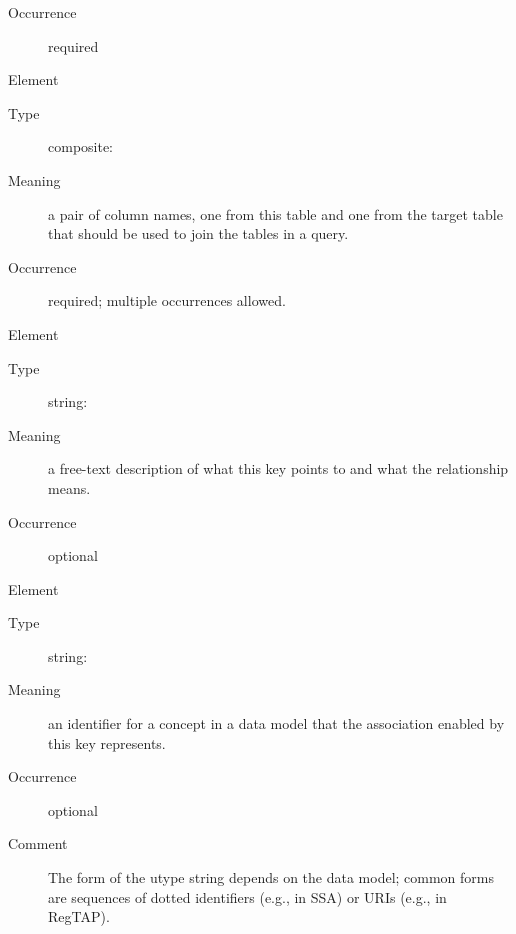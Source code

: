 \documentclass[11pt,a4paper]{ivoa}
\begin{document}
\begin{generated}
\begin{bigdescription}
\begin{description}
\item[Occurrence] required

\end{description}
\item[Element \xmlel{fkColumn}]
\begin{description}
\item[Type] composite: 
\item[Meaning] 
               a pair of column names, one from this table and one
               from the target table that should be used to join the
               tables in a query.  
             
\item[Occurrence] required; multiple occurrences allowed.

\end{description}
\item[Element \xmlel{description}]
\begin{description}
\item[Type] string: 
\item[Meaning] 
                  a free-text description of what this key points to
                  and what the relationship means.  
               
\item[Occurrence] optional

\end{description}
\item[Element \xmlel{utype}]
\begin{description}
\item[Type] string: 
\item[Meaning] 
                  an identifier for a concept in a data model that
                  the association enabled by this key represents.  
               
\item[Occurrence] optional
\item[Comment] 
                  The form of the utype string depends on the data
                  model; common forms are sequences of dotted identifiers
                  (e.g., in SSA) or URIs (e.g., in RegTAP).
               

\end{description}


\end{bigdescription}\endgroup

\endgroup
\end{generated}
\end{document}
